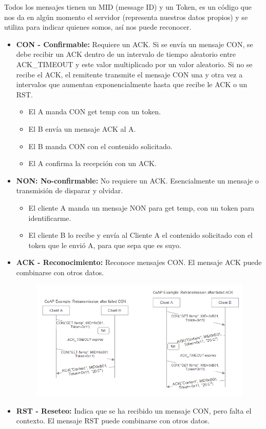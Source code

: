 \documentclass[12pt]{report} %
\begin{document}
Todos los mensajes tienen un MID (message ID) y un Token, es un código que nos da en algún momento el servidor (representa nuestros datos propios) y se utiliza para indicar quienes somos, así nos puede reconocer.

\begin{itemize}
	\item \textbf{CON - Confirmable:} Requiere un ACK. Si se envía un mensaje CON, se debe recibir un ACK dentro de un intervalo de tiempo aleatorio entre ACK\_TIMEOUT y este valor multiplicado por un valor aleatorio. Si no se recibe el ACK, el remitente transmite el mensaje CON una y otra vez a intervalos que aumentan exponencialmente hasta que recibe le ACK o un RST.
	\begin{itemize}
		\item El A manda CON get \/temp con un token. 
		\item El B envía un mensaje ACK al A.
		\item El B manda CON con el contenido solicitado.
		\item El A confirma la recepción con un ACK.
	\end{itemize}
	\item \textbf{NON: No-confirmable:} No requiere un ACK. Esencialmente un mensaje o transmisión de disparar y olvidar.
	\begin{itemize}
		\item El cliente A manda un mensaje NON para get \/temp, con un token para identificarme.
		\item El cliente B lo recibe y envía al Cliente A el contenido solicitado con el token que le envió A, para que sepa que es suyo.
	\end{itemize}
	\item \textbf{ACK - Reconocimiento:} Reconoce mensajes CON. El mensaje ACK puede combinarse con otros datos.
	\begin{figure}[H]
		{\includegraphics[scale=.48]{b15b5a2c-b9bc-4099-8786-a2bb1272ac9c.png}}
	\end{figure}
	\item \textbf{RST - Reseteo:} Indica que se ha recibido un mensaje CON, pero falta el contexto. El mensaje RST puede combinarse con otros datos.
\end{itemize}
	
\end{document}

